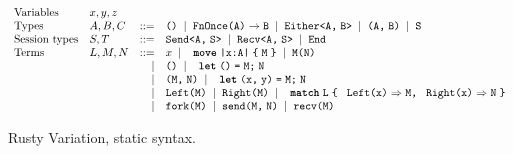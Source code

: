 \begin{figure*}
  \begin{mdframed}\begin{highlight}
    \[
    \begin{array}{llrl}
      \text{Variables}
      &\tm{x}, \tm{y}, \tm{z}
      \\
      \text{Types}
      &\ty{A}, \ty{B}, \ty{C}
      &::=& \rvTyUnit
            \sep \rvTyFun{A}{B}
            \sep \rvTySum{A}{B}
            \sep \rvTyPair{A}{B}
            \sep \texttt{\ty{S}}
      \\
      \text{Session types}
      &\ty{S}, \ty{T}
      &::=& \rvTySend{A}{S}
            \sep \rvTyRecv{A}{S}
            \sep \rvTyEnd
      \\
      \text{Terms}
      &\tm{L}, \tm{M}, \tm{N}
      &::=& \tm{x}
            \sep \rvAbs[A]{x}{M}
            \sep \rvApp{M}{N}
      \\
      &
      &\mid& \rvUnit
             \sep \rvLetUnit{M}{N}
     \\
      &
      &\mid& \rvPair{M}{N}
             \sep \rvLetPair{x}{y}{M}{N}
      \\
      &
      &\mid& \rvInl{M}
             \sep \rvInr{M}
             \sep \rvCaseSum{L}{x}{M}{x}{N}
      \\
      &
      &\mid& \rvFork{M}
             \sep \rvSend{M}{N}
             \sep \rvRecv{M}
    \end{array}
    \]
  \end{highlight}\end{mdframed}
  \caption{Rusty Variation, static syntax.}
  \label{fig:rv-static-syntax}
\end{figure*}

